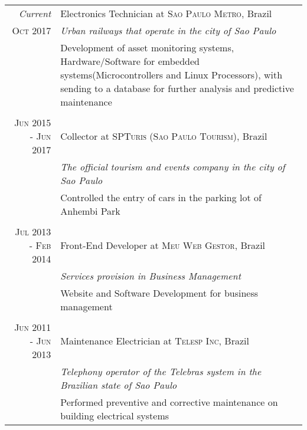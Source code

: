 \documentclass[a4paper,10pt]{article} %
\begin{document}
\begin{tabular}{r|p{11cm}}

\emph{Current} &  Electronics Technician at \textsc{Sao Paulo Metro}, Brazil \\
\textsc{Oct 2017} & \emph{Urban railways that operate in the city of Sao Paulo}\\ 
& \footnotesize{Development of asset monitoring systems, Hardware/Software for embedded systems(Microcontrollers and Linux Processors), with sending to a database for further analysis and predictive maintenance}\\
\multicolumn{2}{c}{} \\


\textsc{Jun} 2015 - \textsc{Jun} 2017 & Collector at \textsc{SPTuris (Sao Paulo Tourism)}, Brazil \\& \emph{The official tourism and events company in the city of Sao Paulo}\\
& \footnotesize{Controlled the entry of cars in the parking lot of Anhembi Park}\\
\multicolumn{2}{c}{} \\


\textsc{Jul} 2013 - \textsc{Feb} 2014 & Front-End Developer at \textsc{Meu Web Gestor}, Brazil \\& \emph{Services provision in Business Management}\\
& \footnotesize{Website and Software Development for business management}\\
\multicolumn{2}{c}{} \\


\textsc{Jun} 2011 - \textsc{Jun} 2013 & Maintenance Electrician at \textsc{Telesp Inc}, Brazil \\& \emph{Telephony operator of the Telebras system in the Brazilian state of Sao Paulo}\\
& \footnotesize{Performed preventive and corrective maintenance on building electrical systems}\\



\end{tabular}

\end{document}

